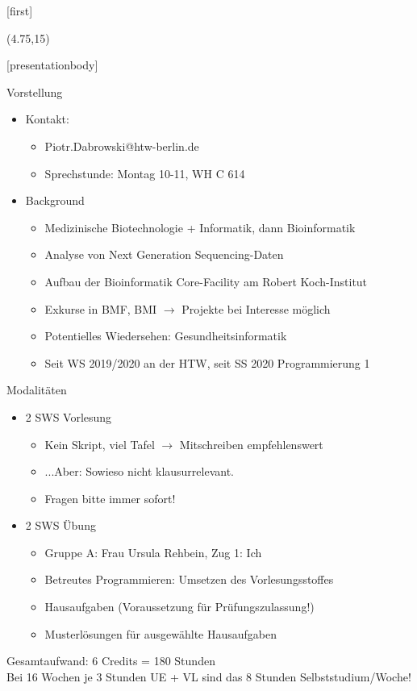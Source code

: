 \documentclass[aspectratio=169,t]{beamer}
\subtitle{1: Allgemeines}
\begin{document}
[first]

\begin{frame}[noframenumbering]
    \titlepage
    \begin{textblock}{10}(4.75,15)
        \cite{logo}
    \end{textblock}
\end{frame}

[presentationbody] 

\begin{frame}{Vorstellung}
	\begin{itemize}
		\item Kontakt:
		\begin{itemize}
			\item Piotr.Dabrowski@htw-berlin.de
			\item Sprechstunde: Montag 10-11, WH C 614
		\end{itemize}
		\item Background
		\begin{itemize}
			\item Medizinische Biotechnologie + Informatik, dann Bioinformatik
			\item Analyse von Next Generation Sequencing-Daten
			\item Aufbau der Bioinformatik Core-Facility am Robert Koch-Institut
			\item Exkurse in BMF, BMI $\rightarrow$ Projekte bei Interesse möglich
			\item Potentielles Wiedersehen: Gesundheitsinformatik
			\item Seit WS 2019/2020 an der HTW, seit SS 2020 Programmierung 1
		\end{itemize}
	\end{itemize}
\end{frame}

\begin{frame}{Modalitäten}
	\begin{itemize}
		\item 2 SWS Vorlesung
		\begin{itemize}
			\item Kein Skript, viel Tafel $\rightarrow$ Mitschreiben empfehlenswert
			\item ...Aber: Sowieso nicht klausurrelevant.
			\item Fragen bitte immer sofort!
		\end{itemize}
		\item 2 SWS Übung
		\begin{itemize}
			\item Gruppe A: Frau Ursula Rehbein, Zug 1: Ich
			\item Betreutes Programmieren: Umsetzen des Vorlesungsstoffes
			\item Hausaufgaben (Voraussetzung für Prüfungszulassung!)
			\item Musterlösungen für ausgewählte Hausaufgaben
		\end{itemize}
	\end{itemize}
	Gesamtaufwand: 6 Credits = 180 Stunden\\
	Bei 16 Wochen je 3 Stunden UE + VL sind das 8 Stunden Selbststudium/Woche!
\end{frame}
\end{document}
